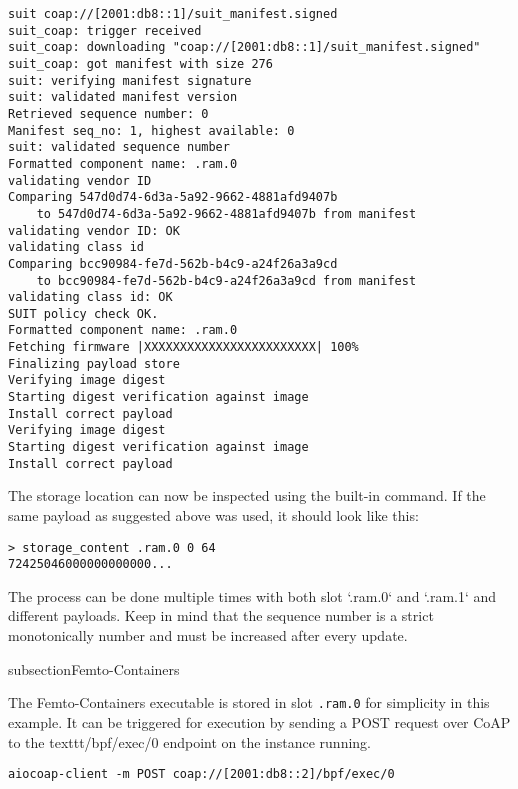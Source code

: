 \documentclass[../main.tex]{subfiles}
\begin{document}
\begin{lstlisting}
suit coap://[2001:db8::1]/suit_manifest.signed
suit_coap: trigger received
suit_coap: downloading "coap://[2001:db8::1]/suit_manifest.signed"
suit_coap: got manifest with size 276
suit: verifying manifest signature
suit: validated manifest version
Retrieved sequence number: 0
Manifest seq_no: 1, highest available: 0
suit: validated sequence number
Formatted component name: .ram.0
validating vendor ID
Comparing 547d0d74-6d3a-5a92-9662-4881afd9407b
	to 547d0d74-6d3a-5a92-9662-4881afd9407b from manifest
validating vendor ID: OK
validating class id
Comparing bcc90984-fe7d-562b-b4c9-a24f26a3a9cd
	to bcc90984-fe7d-562b-b4c9-a24f26a3a9cd from manifest
validating class id: OK
SUIT policy check OK.
Formatted component name: .ram.0
Fetching firmware |XXXXXXXXXXXXXXXXXXXXXXXX| 100%
Finalizing payload store
Verifying image digest
Starting digest verification against image
Install correct payload
Verifying image digest
Starting digest verification against image
Install correct payload
\end{lstlisting}

The storage location can now be inspected using the built-in command. If the
same payload as suggested above was used, it should look like this:

\begin{lstlisting}
> storage_content .ram.0 0 64
72425046000000000000...
\end{lstlisting}

The process can be done multiple times with both slot `.ram.0` and `.ram.1` and
different payloads. Keep in mind that the sequence number is a strict
monotonically number and must be increased after every update.

subsection{Femto-Containers}

The Femto-Containers executable is stored in slot \texttt{.ram.0} for simplicity in
this example. It can be triggered for execution by sending a POST request over
CoAP to the texttt{/bpf/exec/0} endpoint on the instance running.

\begin{lstlisting}
aiocoap-client -m POST coap://[2001:db8::2]/bpf/exec/0
\end{lstlisting}
\end{document}
